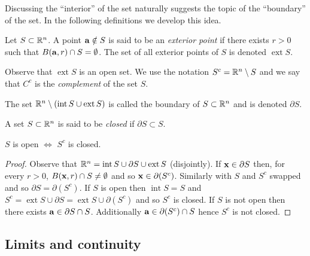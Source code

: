 Discussing the ``interior'' of the set naturally suggests the topic of the ``boundary'' of the set.
In the following definitions we develop this idea.


\begin{definition}
    Let \(S\subset \bR^n\).
    A point \(\aa \notin S\) is said to be an \emph{exterior point} if there exists \(r>0\) such that \(B(\aa,r)\cap S = \emptyset\).
    The set of all exterior points of \(S\) is denoted \(\operatorname{ext} S\).
\end{definition}

Observe that \(\operatorname{ext} S\) is an open set.
We use the notation \(S^c = \bR^n \setminus S\) and we say that \(C^c\) is the \emph{complement} of the set \(S\).



\begin{definition}[boundary]
    The set \(\bR^n \setminus (\operatorname{int} S \cup \operatorname{ext} S )\) is called the boundary of \(S \subset \bR^n\) and is denoted \(\partial S\).
\end{definition}


\begin{definition}[closed]
    A set \(S\subset \bR^n\) is said to be \emph{closed} if \(\partial S \subset S\).
\end{definition}

\begin{lemma}
    \(S\) is open \(\Longleftrightarrow \) \(S^c\) is closed.
\end{lemma}
\begin{proof}
    Observe that \(\bR^n =  \operatorname{int} S \cup \partial S \cup \operatorname{ext} S\) (disjointly).
    If \(\xx \in \partial S\) then, for every \(r>0\), \(B(\xx,r) \cap S \neq \emptyset\) and so \(\xx \in \partial(S^c)\).
    Similarly with \(S\) and \(S^c\) swapped and so \(\partial S = \partial(S^c)\).
    If \(S\) is open then \(\operatorname{int} S = S\) and \(S^c = \operatorname{ext} S \cup \partial S =  \operatorname{ext} S \cup \partial (S^c)\) and so \(S^c\) is closed.
    If \(S\) is not open then there exists \(\aa \in \partial S \cap S\). Additionally  \(\aa \in \partial (S^c) \cap S\) hence \(S^c\) is not closed.
\end{proof}


\subsection*{Limits and continuity}

